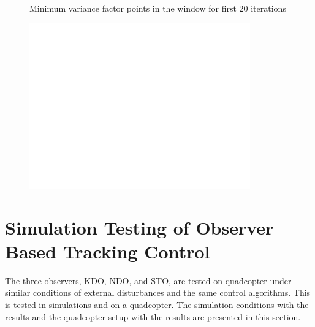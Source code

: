 \documentclass[letterpaper%
, twoside%
, 12pt%
,memoire%
, english%
,creativecommons,hyperref%
]{thETS}
\theoremstyle{newThmStyle}
\begin{document}
\begin{figure}
	\centering
	\parbox{0.75\textwidth}{\caption{Minimum variance factor points in the window for first 20 iterations}\label{Fig:minVarPts}}
\end{figure}
\begin{figure}
	\includegraphics[width=0.85\textwidth]{Figures/blank.png}
\end{figure}

\FloatBarrier

\chapter{Simulation Testing of Observer Based Tracking Control} \label{Chap:ResultsSim}
The three observers, KDO, NDO, and STO, are tested on quadcopter under similar conditions of external disturbances and the same control algorithms. This is tested in simulations and on a quadcopter. The simulation conditions with the results and the quadcopter setup with the results are presented in this section. 
\end{document}

